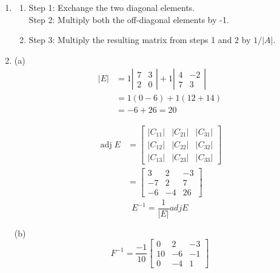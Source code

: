 \begin{enumerate}
\item[3.] 
\begin{enumerate}
\item Step 1: Exchange the two diagonal elements.\\
Step 2: Multiply both the off-diagonal elements by -1.

\item Step 3: Multiply the resulting matrix from steps 1 and 2 by \(1/|A|\).
\end{enumerate}

\item[4.] (a)\[
\begin{aligned}
|E| &=1\left|\begin{array}{ll}
7 & 3 \\
2 & 0
\end{array}\right|+1\left|\begin{array}{rr}
4 & -2 \\
7 & 3
\end{array}\right| \\
&=1(0-6)+1(12+14) \\
&=-6+26=20
\end{aligned}
\]

\[
\begin{aligned}
\operatorname{adj} E &=\left[\begin{array}{ccc}
\left|C_{11}\right| & \left|C_{21}\right| & \left|C_{31}\right| \\
\left|C_{12}\right| & \left|C_{22}\right| & \left|C_{32}\right| \\
\left|C_{13}\right| & \left|C_{23}\right| & \left|C_{33}\right|
\end{array}\right] \\
&=\left[\begin{array}{ccc}
3 & 2 & -3 \\
-7 & 2 & 7 \\
-6 & -4 & 26
\end{array}\right]
\end{aligned}
\]
\[ E^{-1}=\frac{1}{|E|} a d j E \] 

(b)
\[
F^{-1}=\frac{-1}{10}\left[\begin{array}{ccc}
0 & 2 & -3 \\
10 & -6 & -1 \\
0 & -4 & 1
\end{array}\right]
\]


\end{enumerate}
